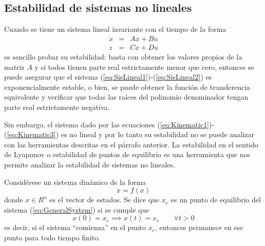 

\subsection{Estabilidad de sistemas no lineales}
Cuando se tiene un sistema lineal invariante con el tiempo de la forma
\begin{eqnarray}
\dot{x} &=& Ax + Bu\label{eq:SisLineal1}\\
z &=& Cx + Du\label{eq:SisLineal2}
\end{eqnarray}
es sencillo probar su estabilidad: basta con obtener los valores propios de la matriz $A$ y si todos tienen parte real estrictamente menor que cero, entonces se puede asegurar que el sistema (\ref{eq:SisLineal1})-(\ref{eq:SisLineal2}) es exponencialmente estable, o bien, se puede obtener la función de transferencia equivalente y verificar que todas las raíces del polinomio denominador tengan parte real estrictamente negativa.

Sin embargo, el sistema dado por las ecuaciones (\ref{eq:Kinematic1})-(\ref{eq:Kinematic3}) es no lineal y por lo tanto su estabilidad no se puede analizar con las herramientas descritas en el párrafo anterior. La estabilidad en el sentido de Lyapunov o estabilidad de puntos de equilibrio es una herramienta que nos permite analizar la estabilidad de sistemas no lineales. 

Considérese un sistema dinámico de la forma 
\begin{equation}
\dot{x} = f(x) \label{eq:GeneralSystem}
\end{equation}
donde $x\in R^n$ es el vector de estados. Se dice que $x_e$ es un punto de equilibrio del sistema (\ref{eq:GeneralSystem}) si se cumple que
\begin{equation}
\label{eq:Equilibrium}
x(0) = x_e \implies x(t) = x_e \qquad\forall t > 0
\end{equation}
es decir, si el sistema ``comienza'' en el punto $x_e$, entonces permanece en ese punto para todo tiempo finito.

